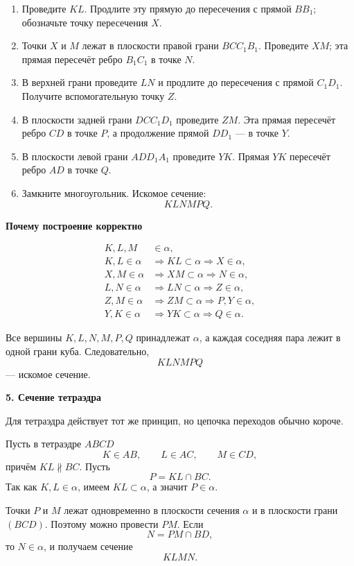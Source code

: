 \documentclass[a4paper,12pt]{article}
\newcommand{\sectitle}[1]{%
  \vspace{0.55em}%
  {\Large\bfseries\color{darkaccent}#1\par}%
  \vspace{0.2em}%
  \noindent{\color{accent}\rule{\linewidth}{0.8pt}}%
  \vspace{0.45em}%
}
\newcommand{\subtopic}[1]{%
  \vspace{0.4em}%
  {\large\bfseries\color{darkaccent}#1\par}%
  \vspace{0.15em}%
}
\begin{document}
\begin{enumerate}
  \item Проведите $KL$. Продлите эту прямую до пересечения с прямой $BB_1$; обозначьте точку пересечения $X$.
  \item Точки $X$ и $M$ лежат в плоскости правой грани $BCC_1B_1$. Проведите $XM$; эта прямая пересечёт ребро $B_1C_1$ в точке $N$.
  \item В верхней грани проведите $LN$ и продлите до пересечения с прямой $C_1D_1$. Получите вспомогательную точку $Z$.
  \item В плоскости задней грани $DCC_1D_1$ проведите $ZM$. Эта прямая пересечёт ребро $CD$ в точке $P$, а продолжение прямой $DD_1$ --- в точке $Y$.
  \item В плоскости левой грани $ADD_1A_1$ проведите $YK$. Прямая $YK$ пересечёт ребро $AD$ в точке $Q$.
  \item Замкните многоугольник. Искомое сечение:
  \[
    \boxed{KLNMPQ}.
  \]
\end{enumerate}

\subtopic{Почему построение корректно}

\begin{align*}
K,L,M&\in\alpha,\\
K,L\in\alpha
&\Longrightarrow KL\subset\alpha
\Longrightarrow X\in\alpha,\\
X,M\in\alpha
&\Longrightarrow XM\subset\alpha
\Longrightarrow N\in\alpha,\\
L,N\in\alpha
&\Longrightarrow LN\subset\alpha
\Longrightarrow Z\in\alpha,\\
Z,M\in\alpha
&\Longrightarrow ZM\subset\alpha
\Longrightarrow P,Y\in\alpha,\\
Y,K\in\alpha
&\Longrightarrow YK\subset\alpha
\Longrightarrow Q\in\alpha.
\end{align*}

Все вершины $K,L,N,M,P,Q$ принадлежат $\alpha$, а каждая соседняя пара лежит в одной грани куба. Следовательно,
\[
\boxed{KLNMPQ}
\]
--- искомое сечение.

\sectitle{5. Сечение тетраэдра}

Для тетраэдра действует тот же принцип, но цепочка переходов обычно короче.

Пусть в тетраэдре $ABCD$
\[
K\in AB,
\qquad
L\in AC,
\qquad
M\in CD,
\]
причём $KL\not\parallel BC$. Пусть
\[
P=KL\cap BC.
\]
Так как $K,L\in\alpha$, имеем $KL\subset\alpha$, а значит $P\in\alpha$.

Точки $P$ и $M$ лежат одновременно в плоскости сечения $\alpha$ и в плоскости грани $(BCD)$. Поэтому можно провести $PM$. Если
\[
N=PM\cap BD,
\]
то $N\in\alpha$, и получаем сечение
\[
\boxed{KLMN}.
\]
\end{document}
